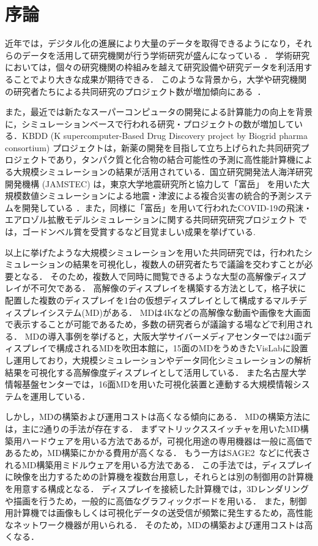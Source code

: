 \chapter{序論}

近年では，デジタル化の進展により大量のデータを取得できるようになり，それらのデータを活用して研究機関が行う学術研究が盛んになっている \cite{guideline}．
学術研究においては，個々の研究機関の枠組みを越えて研究設備や研究データを利活用することでより大きな成果が期待できる．
このような背景から，大学や研究機関の研究者たちによる共同研究のプロジェクト数が増加傾向にある~\cite{nisted,soumusyou}．

また，最近では新たなスーパーコンピュータの開発による計算能力の向上を背景に，シミュレーションベースで行われる研究・プロジェクトの数が増加している．KBDD (K supercomputer-Based Drug Discovery project by Biogrid pharma consortium) プロジェクト\cite{kbdd,kbddproject}は，新薬の開発を目指して立ち上げられた共同研究プロジェクトであり，タンパク質と化合物の結合可能性の予測に高性能計算機による大規模シミュレーションの結果が活用されている．国立研究開発法人海洋研究開発機構 (JAMSTEC) は，東京大学地震研究所と協力して「富岳」 \cite{fugaku}を用いた大規模数値シミュレーションによる地震・津波による複合災害の統合的予測システムを開発している \cite{jishin,FUJITA2021101277}．また，同様に「富岳」を用いて行われたCOVID-19の飛沫・エアロゾル拡散モデルシミュレーションに関する共同研究研究プロジェクト \cite{covid-19,ando2021digital}では，ゴードンベル賞を受賞するなど目覚ましい成果を挙げている.

以上に挙げたような大規模シミュレーションを用いた共同研究では，行われたシミュレーションの結果を可視化し，複数人の研究者たちで議論を交わすことが必要となる．
そのため，複数人で同時に閲覧できるような大型の高解像ディスプレイが不可欠である．
高解像のディスプレイを構築する方法として，格子状に配置した複数のディスプレイを1台の仮想ディスプレイとして構成するマルチディスプレイシステム(MD)がある．
MDは4Kなどの高解像な動画や画像を大画面で表示することが可能であるため，多数の研究者らが議論する場などで利用される．
MDの導入事例を挙げると，大阪大学サイバーメディアセンターでは24面ディスプレイで構成されるMDを吹田本館に，15面のMDをうめきたVisLabに設置し運用しており，大規模シミュレーションやデータ同化シミュレーションの解析結果を可視化する高解像度ディスプレイとして活用している\cite{ciber_media}．
また名古屋大学情報基盤センターでは，16面MDを用いた可視化装置と連動する大規模情報システムを運用している\cite{nagoya}．

しかし，MDの構築および運用コストは高くなる傾向にある．
MDの構築方法には，主に2通りの手法が存在する．
まずマトリックススイッチャを用いたMD構築用ハードウェアを用いる方法であるが，可視化用途の専用機器は一般に高価であるため，MD構築にかかる費用が高くなる．
もう一方はSAGE2~\cite{sage2}などに代表されるMD構築用ミドルウェアを用いる方法である．
この手法では，ディスプレイに映像を出力するための計算機を複数台用意し，それらとは別の制御用の計算機を用意する構成となる．
ディスプレイを接続した計算機では，3Dレンダリングや描画を行うため，一般的に高価なグラフィックボードを用いる．
また，制御用計算機では画像もしくは可視化データの送受信が頻繁に発生するため，高性能なネットワーク機器が用いられる．
そのため，MDの構築および運用コストは高くなる．

